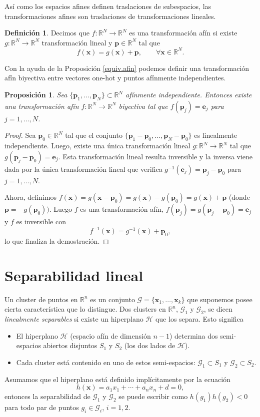 \documentclass[12pt, a4paper]{amsbook}
\newcommand{\R}{{\mathbb R}}
\newcommand{\Hc}{{\mathcal H}}
\newcommand{\G}{{\mathcal G}}
\newcommand{\pp}{{\mathbf p}}
\newcommand{\xx}{{\mathbf x}}
\newcommand{\ee}{{\mathbf e}}
\newtheorem{prop}[teo]{Proposici\'on}
\theoremstyle{remark}
\theoremstyle{definition}
\newtheorem{defi}[teo]{Definici\'on}
\numberwithin{section}{chapter}
\numberwithin{subsection}{section}
\numberwithin{equation}{section}
\numberwithin{figure}{chapter}
\begin{document}
Así como los espacios afines definen traslaciones de subespacios, las transformaciones afines son traslaciones de transformaciones lineales.
\begin{defi}
Decimos que $f\colon \R^N\to\R^N$ es una transformación afín si existe $g\colon \R^N\to\R^N$ transformación lineal y $\pp\in\R^N$ tal que
$$
f(\xx) = g(\xx) + \pp,\qquad \forall \xx\in\R^N.
$$
\end{defi}

Con la ayuda de la Proposición \ref{equiv.afin} podemos definir una transformación afín biyectiva entre vectores one-hot y puntos afínmente independientes.
\begin{prop}
Sea $\{\pp_1,\dots,\pp_N\}\subset \R^N$ afínmente independiente. Entonces existe una transformación afín $f\colon \R^N\to\R^N$ biyectiva tal que $f(\pp_j)=\ee_j$ para $j=1,\dots,N$.
\end{prop}

\begin{proof}
Sea $\pp_0\in\R^N$ tal que el conjunto $\{\pp_1-\pp_0,\dots,\pp_N-\pp_0\}$ es linealmente independiente. Luego, existe una única transformación lineal $g\colon \R^N\to\R^N$ tal que $g(\pp_j-\pp_0)=\ee_j$. Esta transformación lineal resulta inversible y la inversa viene dada por la única transformación lineal que verifica $g^{-1}(\ee_j) = \pp_j-\pp_0$ para $j=1,\dots,N$.

Ahora, definimos $f(\xx) = g(\xx-\pp_0) = g(\xx) - g(\pp_0) = g(\xx) + \pp$ (donde $\pp=-g(\pp_0))$. Luego $f$ es una transformación afín, $f(\pp_j) = g(\pp_j-\pp_0)=\ee_j$ y $f$ es inversible con
$$
f^{-1}(\xx) = g^{-1}(\xx) + \pp_0,
$$
lo que finaliza la demostración.
\end{proof}

\section{Separabilidad lineal}\label{sec.c10.5}

Un cluster de puntos en $\R^n$ es un conjunto $\G = \{\xx_1,\dots,\xx_k\}$ que suponemos posee cierta característica que lo distingue. Dos clusters en $\R^n$, $\G_1$ y $\G_2$, se dicen {\em linealmente separables} si existe un hiperplano $\Hc$ que los separa. Esto significa
\begin{itemize}
\item[(i)] El hiperplano $\Hc$ (espacio afín de dimensión $n-1$) determina dos semi-espacios abiertos disjuntos $S_1$ y $S_2$ (los dos lados de $\Hc$).
\item[(ii)] Cada cluster está contenido en uno de estos semi-espacios: $\G_1\subset S_1$ y $\G_2\subset S_2$.
\end{itemize}
Asumamos que el hiperplano está definido implícitamente por la ecuación
$$
h(\xx) = a_1 x_1 + \cdots + a_n x_n + d = 0,
$$
entonces la separabilidad de $\G_1$ y $\G_2$ se puede escribir como $h(g_1)h(g_2)<0$ para todo par de puntos $g_i\in \G_i$, $i=1, 2$.
\end{document}
